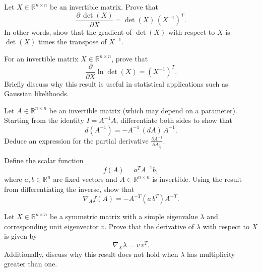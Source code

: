 \begin{exercise}
   Let $X \in \mathbb{R}^{n\times n}$ be an invertible matrix. Prove that
   \[
      \frac{\partial\,\det(X)}{\partial X} = \det(X)\,(X^{-1})^T.
   \]
   In other words, show that the gradient of $\det(X)$ with respect to $X$ is $\det(X)$ times the transpose of $X^{-1}$.
\end{exercise}

\begin{exercise}
   For an invertible matrix $X \in \mathbb{R}^{n\times n}$, prove that
   \[
      \frac{\partial}{\partial X}\ln\det(X) = (X^{-1})^T.
   \]
   Briefly discuss why this result is useful in statistical applications such as Gaussian likelihoods.
\end{exercise}

\begin{exercise}
   Let $A \in \mathbb{R}^{n\times n}$ be an invertible matrix (which may depend on a parameter). Starting from the identity $I = A^{-1}A$, differentiate both sides to show that
   \[
      d(A^{-1}) = -A^{-1}\,(dA)\,A^{-1}.
   \]
   Deduce an expression for the partial derivative $\frac{\partial A^{-1}}{\partial A_{ij}}$.
\end{exercise}

\begin{exercise}
   Define the scalar function
   \[
      f(A)=a^T A^{-1} b,
   \]
   where $a,b\in\mathbb{R}^n$ are fixed vectors and $A\in\mathbb{R}^{n\times n}$ is invertible. Using the result from differentiating the inverse, show that
   \[
      \nabla_A f(A) = -A^{-T}(a\,b^T)A^{-T}.
   \]
\end{exercise}

\begin{exercise}
   Let $X\in\mathbb{R}^{n\times n}$ be a symmetric matrix with a simple eigenvalue $\lambda$ and corresponding unit eigenvector $v$. Prove that the derivative of $\lambda$ with respect to $X$ is given by
   \[
      \nabla_X \lambda = v\,v^T.
   \]
   Additionally, discuss why this result does not hold when $\lambda$ has multiplicity greater than one.
\end{exercise}


